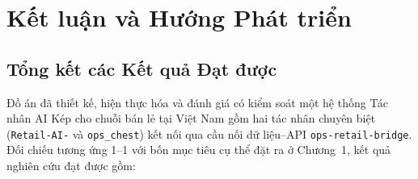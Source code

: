 \chapter{Kết luận và Hướng Phát triển}

\section{Tổng kết các Kết quả Đạt được}

Đồ án đã thiết kế, hiện thực hóa và đánh giá có kiểm soát một hệ thống Tác nhân AI Kép cho chuỗi bán lẻ tại Việt Nam gồm hai tác nhân chuyên biệt (\texttt{Retail-AI-} và \texttt{ops\_chest}) kết nối qua cầu nối dữ liệu--API \texttt{ops-retail-bridge}. Đối chiếu tương ứng 1--1 với bốn mục tiêu cụ thể đặt ra ở Chương~1, kết quả nghiên cứu đạt được gồm:

